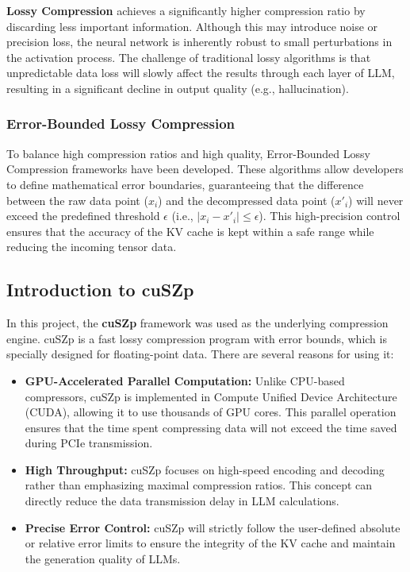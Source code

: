 \documentclass{polyu-comp}
\begin{document}
\textbf{Lossy Compression} \cite{9380370} achieves a significantly higher compression ratio by discarding less important information. Although this may introduce noise or precision loss, the neural network is inherently robust to small perturbations in the activation process. The challenge of traditional lossy algorithms is that unpredictable data loss will slowly affect the results through each layer of LLM, resulting in a significant decline in output quality (e.g., hallucination).

\subsubsection{Error-Bounded Lossy Compression}
To balance high compression ratios and high quality, Error-Bounded Lossy Compression frameworks have been developed. These algorithms allow developers to define mathematical error boundaries, guaranteeing that the difference between the raw data point ($x_i$) and the decompressed data point ($x'_i$) will never exceed the predefined threshold $\epsilon$ (i.e., $|x_i - x'_i| \leq \epsilon$). This high-precision control ensures that the accuracy of the KV cache is kept within a safe range while reducing the incoming tensor data.

\subsection{Introduction to cuSZp}
In this project, the \textbf{cuSZp} framework was used as the underlying compression engine. cuSZp is a fast lossy compression program with error bounds, which is specially designed for floating-point data. There are several reasons for using it:
\begin{itemize}
    \item \textbf{GPU-Accelerated Parallel Computation:} Unlike CPU-based compressors, cuSZp is implemented in Compute Unified Device Architecture (CUDA), allowing it to use thousands of GPU cores. This parallel operation ensures that the time spent compressing data will not exceed the time saved during PCIe transmission.
    \item \textbf{High Throughput:} cuSZp focuses on high-speed encoding and decoding rather than emphasizing maximal compression ratios. This concept can directly reduce the data transmission delay in LLM calculations.
    \item \textbf{Precise Error Control:} cuSZp will strictly follow the user-defined absolute or relative error limits to ensure the integrity of the KV cache and maintain the generation quality of LLMs.
\end{itemize}
\end{document}
